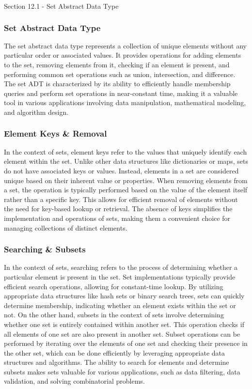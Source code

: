 \begin{notes}{Section 12.1 - Set Abstract Data Type}
    \subsubsection*{Set Abstract Data Type}

    The set abstract data type represents a collection of unique elements without any particular order or associated values. It provides operations for adding elements to the set, removing elements from it, checking if an element is present, and performing common set operations such as union, intersection, and difference. The set ADT is 
    characterized by its ability to efficiently handle membership queries and perform set operations in near-constant time, making it a valuable tool in various applications involving data manipulation, mathematical modeling, and algorithm design.
    
    \subsubsection*{Element Keys \& Removal}
    
    In the context of sets, element keys refer to the values that uniquely identify each element within the set. Unlike other data structures like dictionaries or maps, sets do not have associated keys or values. Instead, elements in a set are considered unique based on their inherent value or properties. When removing elements from a set, 
    the operation is typically performed based on the value of the element itself rather than a specific key. This allows for efficient removal of elements without the need for key-based lookup or retrieval. The absence of keys simplifies the implementation and operations of sets, making them a convenient choice for managing collections of 
    distinct elements.
    
    \subsubsection*{Searching \& Subsets}
    
    In the context of sets, searching refers to the process of determining whether a particular element is present in the set. Set implementations typically provide efficient search operations, allowing for constant-time lookup. By utilizing appropriate data structures like hash sets or binary search trees, sets can quickly determine membership, 
    indicating whether an element exists within the set or not. On the other hand, subsets in the context of sets involve determining whether one set is entirely contained within another set. This operation checks if all elements of one set are also present in another set. Subset operations can be performed by iterating over the elements of one 
    set and checking their presence in the other set, which can be done efficiently by leveraging appropriate data structures and algorithms. The ability to search for elements and determine subsets makes sets valuable for various applications, such as data filtering, data validation, and solving combinatorial problems.
    

\end{notes}

